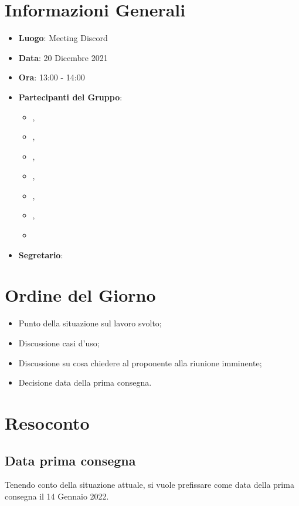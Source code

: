 \section{Informazioni Generali}

\begin{itemize}
\item{\textbf{Luogo}}: Meeting Discord
\item{\textbf{Data}}: 20 Dicembre 2021
\item{\textbf{Ora}}: 13:00 - 14:00
\item{\textbf{Partecipanti del Gruppo}}: 
	\begin{itemize}
	\item{\EP{},} 
	\item{\FP{},}
	\item{\GC{},}
	\item{\LW{},}
	\item{\MB{},}
	\item{\MG{},}
	\item{\PV{}}
	\end{itemize} 
\item{\textbf{Segretario}}: \PV{}	
\end{itemize}

\section{Ordine del Giorno}
\begin{itemize}
\item{Punto della situazione sul lavoro svolto;}
\item{Discussione casi d'uso;}
\item{Discussione su cosa chiedere al proponente alla riunione imminente;}
\item{Decisione data della prima consegna.}
\end{itemize}

\section{Resoconto}

\subsection{Data prima consegna}
Tenendo conto della situazione attuale, si vuole prefissare come data della prima consegna il 14 Gennaio 2022.